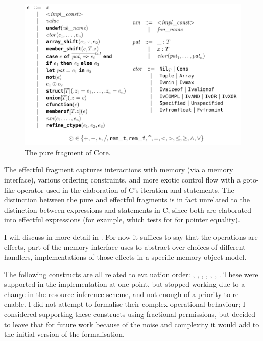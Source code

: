 \begin{figure}[tp]
    \ContinuedFloat*
    \includegraphics{figures/pure-core.png}
    \caption{The pure fragment of Core.}\label{fig:pure-core-grammar}
\end{figure}

The effectful fragment captures interactions with memory (via a memory
interface), various ordering constraints, and more exotic control flow with a
goto-like operator used in the elaboration of C's iteration and 
statements. The distinction between the pure and effectful fragments is in
fact unrelated to the distinction between expressions and statements in C,
since both are elaborated into effectful expressions (for example,
 which tests for for pointer equality).

I will discuss  in more detail in %
. For now it suffices to say that the
operations are effects, part of the memory interface  uses to abstract
over choices of different handlers, implementations of those effects in a
specific memory object model.

The following constructs are all related to evaluation order:
, , , %
, , , %
. These were supported in the implementation at one %
point, but stopped working due to a change
in the resource inference scheme, and not enough of a priority to re-enable. I
did not attempt to formalise their complex operational behaviour;
I considered supporting these constructs using fractional permissions,
but decided to leave that for future work because of the noise and complexity
it would add to the initial version of the formalisation.

